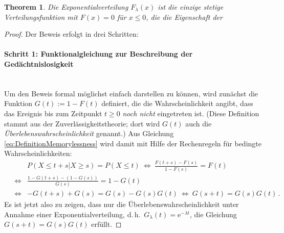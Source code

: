 \documentclass[a4paper,11pt,oneside]{article}
\newtheorem{theorem}{Theorem}
\theoremstyle{definition}
\begin{document}
\begin{theorem}
Die Exponentialverteilung $F_\lambda(x)$ ist die einzige \emph{stetige} Verteilungsfunktion mit $F(x)=0$ für $x\le0$, die die Eigenschaft der
\end{theorem}

\begin{proof}
Der Beweis erfolgt in drei Schritten:

\paragraph{Schritt 1: Funktionalgleichung zur Beschreibung der Gedächtnislosigkeit}~\\
Um den Beweis formal möglichst einfach darstellen zu können, wird zunächst die Funktion $G(t):=1-F(t)$ definiert, die die Wahrscheinlichkeit angibt, dass das Ereignis bis zum Zeitpunkt $t\ge0$ \emph{noch nicht} eingetreten ist. (Diese Definition stammt aus der Zuverlässigkeitstheorie; dort wird $G(t)$ auch die \emph{Überlebenswahrscheinlichkeit} genannt.) Aus Gleichung \eqref{eq:DefinitionMemorylessness} wird damit mit Hilfe der Rechenregeln für bedingte Wahrscheinlichkeiten:
\begin{eqnarray*}
~&~&P(X\le t+s | X\ge s)=P(X\le t)
~\iff~\frac{F(t+s)-F(s)}{1-F(s)}=F(t)\\
~&\iff&\frac{1-G(t+s)-(1-G(s))}{G(s)}=1-G(t)\\
~&\iff&-G(t+s)+G(s)=G(s)-G(s)G(t)
~\iff~G(s+t)=G(s)G(t)\,.
\end{eqnarray*}
Es ist jetzt also zu zeigen, dass nur die Überlebenswahrscheinlichkeit unter Annahme einer Exponentialverteilung, d.\,h.\ $G_\lambda(t)=\mathrm{e}^{-\lambda t}$, die Gleichung $G(s+t)=G(s)G(t)$ erfüllt.


\end{proof}
\end{document}
